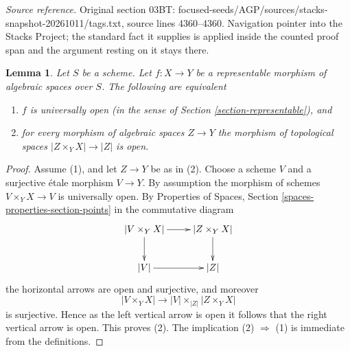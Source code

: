 \documentclass[10pt,a4paper]{amsart}
\theoremstyle{plain}
\newtheorem{lemma}[subsection]{Lemma}
\theoremstyle{definition}
\theoremstyle{remark}
\numberwithin{equation}{subsection}
\begin{document}
\noindent\textit{Source reference.} Original section 03BT: focused-seeds/AGP/sources/stacks-snapshot-20261011/tags.txt, source lines 4360--4360. Navigation pointer into the Stacks Project; the standard fact it supplies is applied inside the counted proof span and the argument resting on it stays there.\par\medskip
\begin{lemma}
\label{lemma-characterize-representable-universally-open}
Let $S$ be a scheme. Let $f : X \to Y$ be a representable morphism of
algebraic spaces over $S$. The following are equivalent
\begin{enumerate}
\item $f$ is universally open
(in the sense of Section \ref{section-representable}), and
\item for every morphism of algebraic spaces $Z \to Y$ the morphism of
topological spaces $|Z \times_Y X| \to |Z|$ is open.
\end{enumerate}
\end{lemma}

\begin{proof}
Assume (1), and let $Z \to Y$ be as in (2). Choose a scheme $V$ and
a surjective \'etale morphism $V \to Y$. By assumption the morphism
of schemes $V \times_Y X \to V$ is universally open. By
Properties of Spaces, Section \ref{spaces-properties-section-points}
in the commutative diagram
$$
\xymatrix{
|V \times_Y X| \ar[r] \ar[d] & |Z \times_Y X| \ar[d] \\
|V| \ar[r] & |Z|
}
$$
the horizontal arrows are open and surjective, and moreover
$$
|V \times_Y X| \longrightarrow |V| \times_{|Z|} |Z \times_Y X|
$$
is surjective. Hence as the left
vertical arrow is open it follows that the right vertical arrow is
open. This proves (2). The implication (2) $\Rightarrow$ (1) is
immediate from the definitions.
\end{proof}
\end{document}
